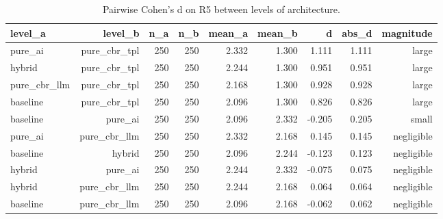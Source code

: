 \begin{table}[htbp]
\centering
\caption{Pairwise Cohen's d on R5 between levels of architecture.}
\label{tab:cohensd-architecture-R5}
\begin{tabular}{lrrrrrrrr}
\toprule
level\_a & level\_b & n\_a & n\_b & mean\_a & mean\_b & d & abs\_d & magnitude \\
\midrule
pure\_ai & pure\_cbr\_tpl & 250 & 250 & 2.332 & 1.300 & 1.111 & 1.111 & large \\
hybrid & pure\_cbr\_tpl & 250 & 250 & 2.244 & 1.300 & 0.951 & 0.951 & large \\
pure\_cbr\_llm & pure\_cbr\_tpl & 250 & 250 & 2.168 & 1.300 & 0.928 & 0.928 & large \\
baseline & pure\_cbr\_tpl & 250 & 250 & 2.096 & 1.300 & 0.826 & 0.826 & large \\
baseline & pure\_ai & 250 & 250 & 2.096 & 2.332 & -0.205 & 0.205 & small \\
pure\_ai & pure\_cbr\_llm & 250 & 250 & 2.332 & 2.168 & 0.145 & 0.145 & negligible \\
baseline & hybrid & 250 & 250 & 2.096 & 2.244 & -0.123 & 0.123 & negligible \\
hybrid & pure\_ai & 250 & 250 & 2.244 & 2.332 & -0.075 & 0.075 & negligible \\
hybrid & pure\_cbr\_llm & 250 & 250 & 2.244 & 2.168 & 0.064 & 0.064 & negligible \\
baseline & pure\_cbr\_llm & 250 & 250 & 2.096 & 2.168 & -0.062 & 0.062 & negligible \\
\bottomrule
\end{tabular}
\end{table}
